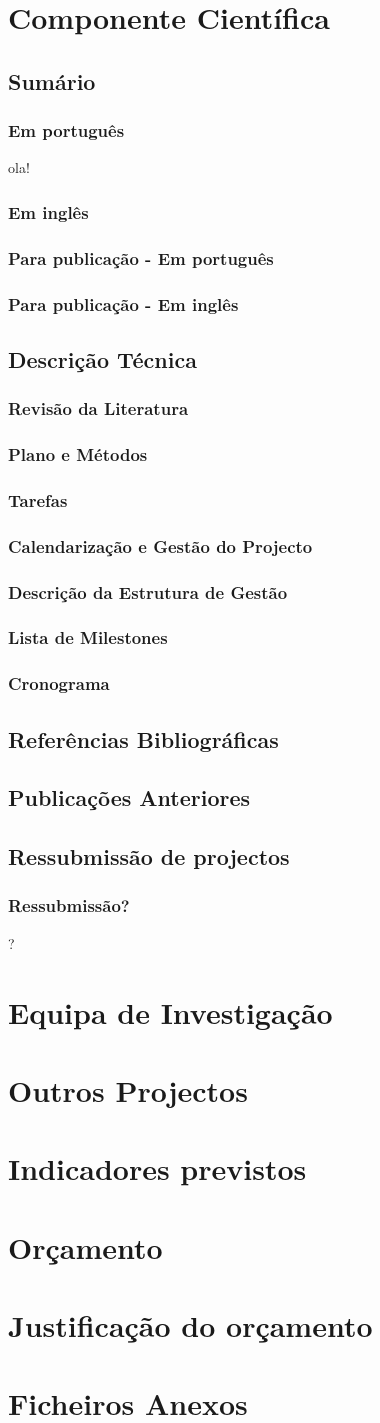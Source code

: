 \documentclass[%
	nofootinbib,
	amsmath,amssymb,
	aps,
	12pt,
	a4paper
]{article}
\newcommand*{\sectionpostamble}{}
\newcommand*{\aka}[2]{%
  \def\sectionpostamble{#2}%
  \section{#1}
}
\newcommand*{\subsectionpostamble}{}
\newcommand*{\subaka}[2]{%
  \def\subsectionpostamble{#2}%
  \subsection{#1}
}
\newcommand*{\subsubsectionpostamble}{}
\newcommand*{\subsubaka}[2]{%
  \def\subsubsectionpostamble{#2}%
  \subsubsection{#1}
}
\begin{document}
\pagebreak

\aka{Componente Científica}{Scientific Component}
\subaka{Sumário}{Abstract}
\subsubaka{Em português}{In Portuguese}
ola!
\subsubaka{Em inglês}{In English}
\subsubaka{Para publicação - Em português}{For publication - In Portuguese}
\subsubaka{Para publicação - Em inglês}{In English}

\subaka{Descrição Técnica}{Technical Description}
\subsubaka{Revisão da Literatura}{Literature Review}
\subsubaka{Plano e Métodos}{Plan and Methods}
\subsubaka{Tarefas}{Tasks}
\subsubaka{Calendarização e Gestão do Projecto}{Project Timeline and Management}
\subsubaka{Descrição da Estrutura de Gestão}{Description of the Management Structure}
\subsubaka{Lista de Milestones}{Milestone List}
\subsubaka{Cronograma}{Timeline}

\subaka{Referências Bibliográficas}{Bibliographic References}
\subaka{Publicações Anteriores}{Past Publications}
\subaka{Ressubmissão de projectos}{Project ressubmission}
\subsubaka{Ressubmissão?}{Ressubmission?}
?
\aka{Equipa de Investigação}{Research team}

\aka{Outros Projectos}{Other projects}

\aka{Indicadores previstos}{Expected indicators}

\aka{Orçamento}{Budget}

\aka{Justificação do orçamento}{Budget rationale}

\aka{Ficheiros Anexos}{Attachments}











\end{document}
